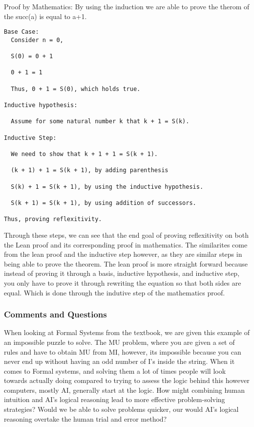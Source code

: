 \documentclass{article}
\theoremstyle{theorem}
\theoremstyle{definition}
\theoremstyle{remark}
\begin{document}
Proof by Mathematics: By using the induction we are able to prove the therom of the succ(a) is equal to a+1.
\begin{lstlisting}
Base Case:
  Consider n = 0,

  S(0) = 0 + 1

  0 + 1 = 1

  Thus, 0 + 1 = S(0), which holds true.

Inductive hypothesis:

  Assume for some natural number k that k + 1 = S(k).

Inductive Step:

  We need to show that k + 1 + 1 = S(k + 1).

  (k + 1) + 1 = S(k + 1), by adding parenthesis

  S(k) + 1 = S(k + 1), by using the inductive hypothesis.

  S(k + 1) = S(k + 1), by using addition of successors.

Thus, proving reflexitivity.
\end{lstlisting}

Through these steps, we can see that the end goal of proving reflexitivity on both the Lean proof and its corresponding proof in mathematics. The similarites come from the lean proof and the inductive step however,
as they are similar steps in being able to prove the theorem. The lean proof is more straight forward because instead of proving it through a basis, inductive hypothesis, and inductive step, you only have to prove
it through rewriting the equation so that both sides are equal. Which is done through the indutive step of the mathematics proof. 

\subsubsection*{Comments and Questions}

When looking at Formal Systems from the textbook, we are given this example of an impossible puzzle to solve. 
The MU problem, where you are given a set of rules and have to obtain MU from MI, however, its impossible because you can never end up without 
having an odd number of I's inside the string. When it comes to Formal systems, and solving them a lot of times people will look towards actually doing 
compared to trying to assess the logic behind this however computers, mostly AI, generally start at the logic. How might combining human intuition and AI's 
logical reasoning lead to more effective problem-solving strategies? Would we be able to solve problems quicker, our would AI's logical reasoning overtake the 
human trial and error method?
\end{document}
